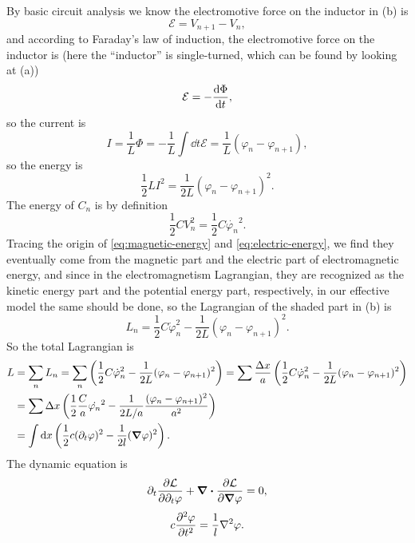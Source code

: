\documentclass[hyperref, a4paper]{article}
\begin{document}
\begin{itemize}
By basic circuit analysis we know 
the electromotive force on the inductor in (b) is
\[
    \mathcal{E} = V_{n+1} - V_{n},
\]
and according to Faraday's law of induction, the electromotive force on the inductor is 
(here the ``inductor'' is single-turned, which can be found by looking at (a))
\[
    \mathcal{E} = - \dv{\Phi}{t},
\]
so the current is 
\[
    I = \frac{1}{L} \Phi = - \frac{1}{L} \int \dd{t} \mathcal{E} = \frac{1}{L} (\varphi_n - \varphi_{n+1}) ,
\]
so the energy is 
\begin{equation}
    \frac{1}{2} L I^2 = \frac{1}{2L} (\varphi_n - \varphi_{n+1})^2.
    \label{eq:magnetic-energy}
\end{equation}
The energy of $C_n$ is by definition
\begin{equation}
    \frac{1}{2} C V_n^2 = \frac{1}{2} C \dot{\varphi_n}^2.
    \label{eq:electric-energy}
\end{equation}
Tracing the origin of \eqref{eq:magnetic-energy} and \eqref{eq:electric-energy},
we find they eventually come from the magnetic part and the electric part of electromagnetic energy,
and since in the electromagnetism Lagrangian,
they are recognized as the kinetic energy part and the potential energy part, respectively,
in our effective model the same should be done, 
so the Lagrangian of the shaded part in (b) is
\begin{equation}
    L_{n} = \frac{1}{2} C \dot{\varphi}_n^2 - \frac{1}{2 L} (\varphi_n - \varphi_{n+1})^2.
\end{equation}
So the total Lagrangian is 
\begin{equation}
    \begin{aligned}
        L &= \sum_n L_n = 
        \sum_n \left( \frac{1}{2} C \dot{\varphi}_n^2 - \frac{1}{2 L} (\varphi_n - \varphi_{n+1})^2 \right) 
        = \sum \frac{\Delta{x}}{a} 
        \left( \frac{1}{2} C \dot{\varphi}_n^2 - \frac{1}{2 L} (\varphi_n - \varphi_{n+1})^2 \right) \\
        &= \sum \Delta{x} \left(
            \frac{1}{2} \frac{C}{a} \dot{\varphi_n}^2 
            - \frac{1}{2 L / a} 
            \frac{(\varphi_n - \varphi_{n+1})^2}{a^2}  
        \right) \\
        &= \int \dd{x} \left(
            \frac{1}{2} c (\partial_t \varphi)^2 - \frac{1}{2 l} (\grad{\varphi})^2
        \right).
    \end{aligned}
\end{equation}
The dynamic equation is 
\[
    \partial_t \pdv{\mathcal{L}}{\partial_t \varphi} + \div \pdv{\mathcal{L}}{\grad{\varphi}} = 0,
\]
\begin{equation}
    c \pdv[2]{\varphi}{t} = \frac{1}{l} \laplacian \varphi.
    \label{eq:telegraph-eq}
\end{equation}


\end{itemize}
\end{document}
